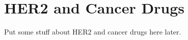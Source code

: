 \chapter{HER2 and Cancer Drugs}
\label{app:apdxb}
Put some stuff about HER2 and cancer drugs here later.